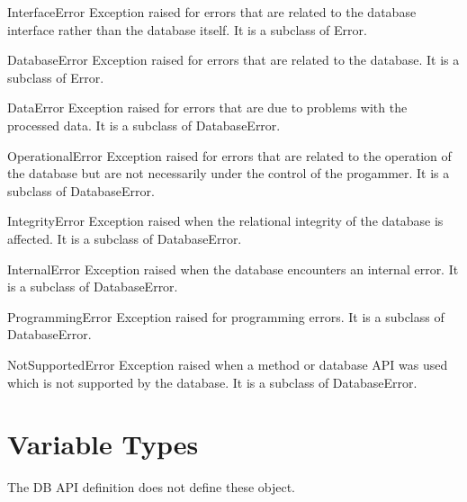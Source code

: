\documentclass{manual}
\begin{document}
\begin{datadesc}{InterfaceError}
  Exception raised for errors that are related to the database interface rather
  than the database itself. It is a subclass of Error.
\end{datadesc}

\begin{datadesc}{DatabaseError}
  Exception raised for errors that are related to the database. It is a
  subclass of Error.
\end{datadesc}

\begin{datadesc}{DataError}
  Exception raised for errors that are due to problems with the processed data.
  It is a subclass of DatabaseError.
\end{datadesc}

\begin{datadesc}{OperationalError}
  Exception raised for errors that are related to the operation of the database
  but are not necessarily under the control of the progammer. It is a
  subclass of DatabaseError.
\end{datadesc}

\begin{datadesc}{IntegrityError}
  Exception raised when the relational integrity of the database is affected.
  It is a subclass of DatabaseError.
\end{datadesc}
 
\begin{datadesc}{InternalError}
  Exception raised when the database encounters an internal error.
  It is a subclass of DatabaseError.
\end{datadesc}
 
\begin{datadesc}{ProgrammingError}
  Exception raised for programming errors. It is a subclass of DatabaseError.
\end{datadesc}
 
\begin{datadesc}{NotSupportedError}
  Exception raised when a method or database API was used which is not
  supported by the database. It is a subclass of DatabaseError.
\end{datadesc}
 
\section{Variable Types}

 The DB API definition does not define these object.
\end{document}
